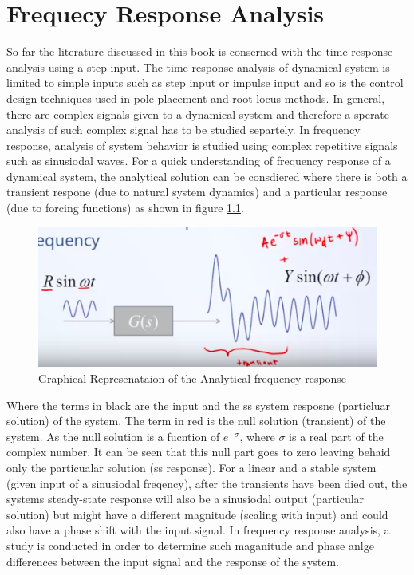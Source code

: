\chapter{Frequecy Response Analysis}

So far the literature discussed in this book is conserned with the time response analysis using a step input. The time response analysis of dynamical system is limited to simple inputs such as step input or impulse input and so is the control design techniques used in pole placement and root locus methods. In general, there are complex signals given to a dynamical system and therefore a sperate analysis of such complex signal has to be studied separtely. In frequency response, analysis of system behavior is studied using complex repetitive signals such as sinusiodal waves. For a quick understanding of frequency response of a dynamical system, the analytical solution can be consdiered where there is both a transient respone (due to natural system dynamics) and a particular response (due to forcing functions) as shown in figure \ref{Fig_FreqResp_GrapSol}.
\begin{figure}[h!]
	\centering
	\includegraphics[width=0.5\linewidth]{Bilder/FrequencyResponse_GraphicalSolution}
	\caption{Graphical Represenataion of the Analytical frequency response}
	\label{Fig_FreqResp_GrapSol}
\end{figure}
Where the terms in black are the input and the ss system resposne (particluar solution) of the system. The term in red is the null solution (transient) of the system. As the null solution is a fucntion of $e^{-\sigma}$, where $\sigma$ is a real part of the complex number. It can be seen that this null part goes to zero leaving behaid only the particualar solution (ss response).
For a linear and a stable system (given input of a sinusiodal freqency), after the transients have been died out, the systems steady-state response will also be a sinusiodal output (particular solution) but might have a different magnitude (scaling with input) and could also have a phase shift with the input signal. In frequency response analysis, a study is conducted in order to determine such maganitude and phase anlge differences between the input signal and the response of the system.

